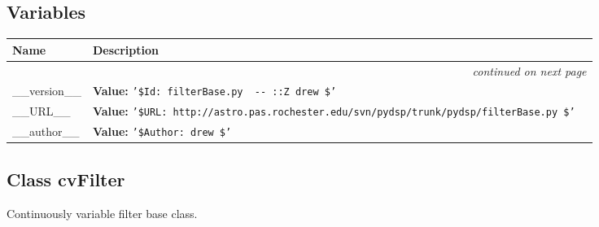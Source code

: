 
  \subsection{Variables}

\begin{longtable}{|p{}|p{}|l}
\cline{1-2}
\cline{1-2} \centering \textbf{Name} & \centering \textbf{Description}& \\
\cline{1-2}
\endhead\cline{1-2}\multicolumn{3}{r}{\small\textit{continued on next page}}\\\endfoot\cline{1-2}
\endlastfoot\raggedright \_\-\_\-v\-e\-r\-s\-i\-o\-n\-\_\-\_\- & \textbf{Value:} 
{\tt '\-\$\-I\-d\-:\-~\-f\-i\-l\-t\-e\-r\-B\-a\-s\-e\-.\-p\-y\-~\-3\-9\-9\-~\-2\-0\-0\-6\--\-0\-6\--\-0\-4\-~\-2\-0\-:\-0\-2\-:\-1\-7\-Z\-~\-d\-r\-e\-w\-~\-\$\-'\-}&\\
\cline{1-2}
\raggedright \_\-\_\-U\-R\-L\-\_\-\_\- & \textbf{Value:} 
{\tt '\-\$\-U\-R\-L\-:\-~\-h\-t\-t\-p\-:\-/\-/\-a\-s\-t\-r\-o\-.\-p\-a\-s\-.\-r\-o\-c\-h\-e\-s\-t\-e\-r\-.\-e\-d\-u\-/\-s\-v\-n\-/\-p\-y\-d\-s\-p\-/\-t\-r\-u\-n\-k\-/\-p\-y\-d\-s\-p\-/\-f\-i\-l\-t\-e\-r\-B\-a\-s\-e\-.\-p\-y\-~\-\$\-'\-}&\\
\cline{1-2}
\raggedright \_\-\_\-a\-u\-t\-h\-o\-r\-\_\-\_\- & \textbf{Value:} 
{\tt '\-\$\-A\-u\-t\-h\-o\-r\-:\-~\-d\-r\-e\-w\-~\-\$\-'\-}&\\
\cline{1-2}
\end{longtable}



\subsection{Class cvFilter}

    \label{filterBase:cvFilter}
Continuously variable filter base class.



